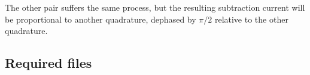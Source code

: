 \begin{bibunit}[plain]
The other pair suffers the same process, but the resulting subtraction current will be proportional to another quadrature, dephased by $\pi/2$ relative to the other quadrature.\\
%


\subsection*{Required files}\label{Required files}


\end{bibunit}
